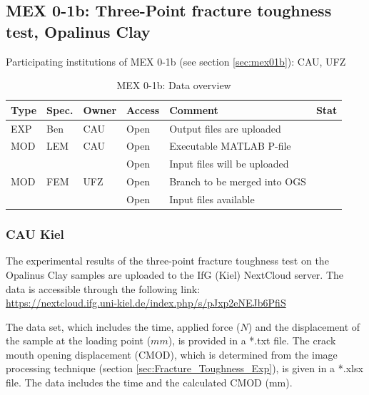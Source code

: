 \subsection{MEX 0-1b: Three-Point fracture toughness test, Opalinus Clay}

Participating institutions of MEX 0-1b (see section \ref{sec:mex01b}): CAU, UFZ

\begin{table}[ht!]
\caption{MEX 0-1b: Data overview}
\label{tab:dms-mex01b-overview}
\small
\begin{tabular}{l|l|l|l|L{4.7cm}|l}
\hline
{}
Type & Spec. & Owner & Access     & Comment                       & Stat \\ 
\hline
EXP  &   Ben    & CAU   & Open       & Output files are uploaded          &  \\
\hline \hline
MOD  & LEM   & CAU   & Open       & Executable MATLAB P-file               &  \\
     &       &       & Open       & Input files will be uploaded  &  \\
\hline
MOD  & FEM   & UFZ   & Open       & Branch to be merged into OGS  &  \\
     &       &       & Open       & Input files available         &  \\
%
\hline
\end{tabular}
\end{table}
\normalsize

\subsubsection*{CAU Kiel}

The experimental results of the three-point fracture toughness test on the Opalinus Clay samples are uploaded to the IfG (Kiel) NextCloud server. The data is accessible through the following link:\\
\url{https://nextcloud.ifg.uni-kiel.de/index.php/s/pJxp2eNEJb6PfiS}

The data set, which includes the time, applied force ($N$) and the displacement of the sample at the loading point ($mm$), is provided in a *.txt file. The crack mouth opening displacement (CMOD), which is determined from the image processing technique (section \ref {sec:Fracture_Toughness_Exp}), is given in a *.xlsx file. The data includes the time and the calculated CMOD (mm). 

